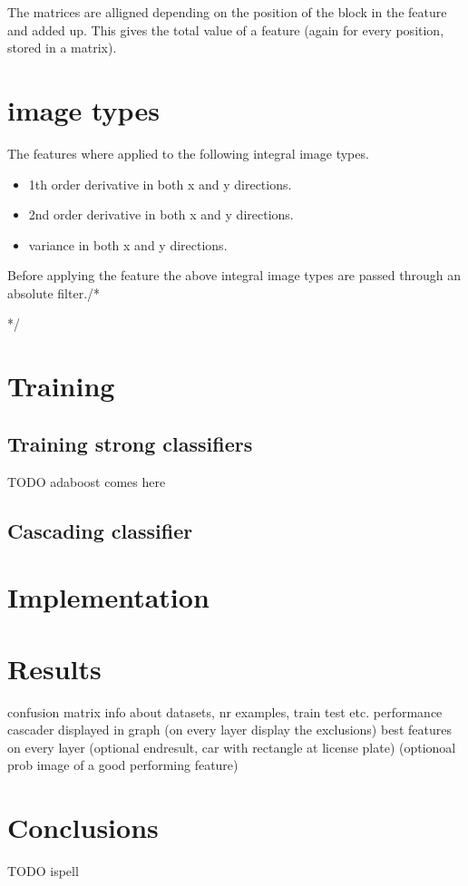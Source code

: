 \documentclass[a4paper,11pt]{article}
\begin{document}
{{{	The matrices are alligned depending on the position of the block in the
	feature and added up. This gives the total value of a feature (again for
	every position, stored in a matrix).

	\section{image types}
	The features where applied to the following integral image types.
	\begin{itemize}
		\item{1th order derivative in both x and y directions.}
		\item{2nd order derivative in both x and y directions.}
		\item{variance in both x and y directions.}
	\end{itemize}
	Before applying the feature the above integral image types are passed through an absolute filter./*}}}*/


\section{Training}
	\subsection*{Training strong classifiers}
	TODO adaboost comes here

	\subsection{Cascading classifier}


\section*{Implementation}

\section*{Results}
confusion matrix
info about datasets, nr examples, train test etc.
performance cascader displayed in graph (on every layer display the exclusions)
best features on every layer
(optional endresult, car with rectangle at license plate)
(optionoal prob image of a good performing feature)


\section*{Conclusions}
TODO ispell

\renewcommand\bibname{References}


\end{document}

